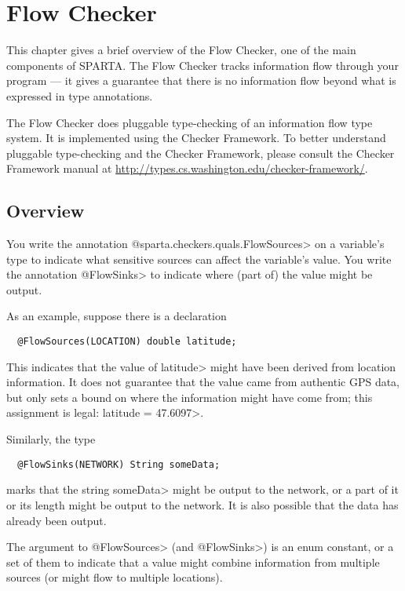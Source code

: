 \htmlhr
\chapter{Flow Checker\label{flow-checker}}

This chapter gives a brief overview of the Flow Checker, one of
the main components of SPARTA\@.  The Flow Checker tracks information flow
through your program --- it gives a guarantee that there is no information
flow beyond what is expressed in type annotations.

The Flow Checker does pluggable type-checking of an information flow type
system.  It is implemented using the Checker Framework.  To better
understand pluggable type-checking and the Checker Framework, please
consult the Checker Framework manual at
\url{http://types.cs.washington.edu/checker-framework/}.  

\section{Overview}

You write the annotation \<@sparta.checkers.quals.FlowSources> on a variable's
type to indicate what sensitive sources can affect the variable's value.
You write the annotation \<@FlowSinks> to indicate where (part of) the
value might be output.

As an example, suppose there is a declaration
\begin{Verbatim}
  @FlowSources(LOCATION) double latitude;
\end{Verbatim}
\noindent
This indicates that the value of \<latitude> might have been derived from
location information.  It does not guarantee that the value came from
authentic GPS data, but only sets a bound on where the information might
have come from; this assignment is legal: \<latitude = 47.6097>.

Similarly, the type
\begin{Verbatim}
  @FlowSinks(NETWORK) String someData;
\end{Verbatim}
\noindent
marks that the string \<someData> might be output to the network, or a part
of it or its length might be output to the network.  It is also possible
that the data has already been output.

The argument to \<@FlowSources> (and \<@FlowSinks>) is an enum constant, or a
set of them to indicate that a value might combine information from
multiple sources (or might flow to multiple locations).

